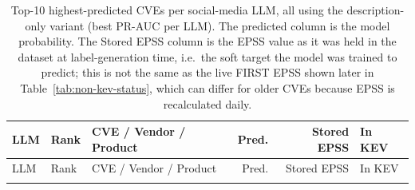 \documentclass[11pt]{article}
\begin{document}
\small
\begin{longtable}{llp{}rrl}
\caption{Top-10 highest-predicted CVEs per social-media LLM, all
using the description-only variant (best PR-AUC per LLM). The
predicted column is the model probability. The Stored EPSS column is
the EPSS value as it was held in the dataset at label-generation
time, i.e.\ the soft target the model was trained to predict; this
is not the same as the live FIRST EPSS shown later in
Table~\ref{tab:non-kev-status}, which can differ for older CVEs
because EPSS is recalculated daily.}\\
\toprule
LLM & Rank & CVE / Vendor / Product & Pred. & Stored EPSS & In KEV \\
\midrule
\endfirsthead
\toprule
LLM & Rank & CVE / Vendor / Product & Pred. & Stored EPSS & In KEV \\
\midrule
\endhead
\bottomrule
\endfoot


\end{longtable}
\end{document}
